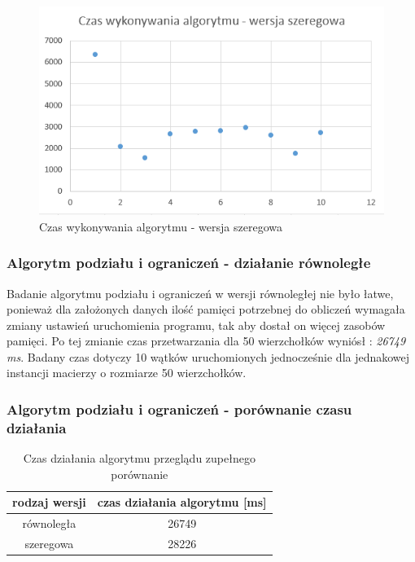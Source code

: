 \documentclass{article}
\begin{document}
		\begin{figure}[H]
			\centering
			\includegraphics[width=0.9\linewidth]{bbS2}
			\caption{Czas wykonywania algorytmu - wersja szeregowa}
		\end{figure}
	
	
		\subsubsection{Algorytm podziału i ograniczeń - działanie równoległe}
			Badanie algorytmu podziału i ograniczeń w wersji równoległej nie było łatwe, ponieważ dla założonych danych ilość pamięci potrzebnej do obliczeń wymagała zmiany ustawień uruchomienia programu, tak aby dostał on więcej zasobów pamięci. Po tej zmianie czas przetwarzania dla 50 wierzchołków wyniósł : \textit{26749 ms}. Badany czas dotyczy 10 wątków uruchomionych jednocześnie dla jednakowej instancji macierzy o rozmiarze 50 wierzchołków.
			
		\subsubsection{Algorytm podziału i ograniczeń - porównanie czasu działania}
			
				\begin{table}[H]
					\centering
					\caption{Czas działania algorytmu przeglądu zupełnego porównanie}
					\begin{tabular}{|c|c|}
						
						\hline rodzaj wersji& czas działania algorytmu [ms] \\ 
						\hline równoległa  & 26749 \\ 
						\hline szeregowa   & 28226 \\ 
						\hline 
					\end{tabular} 
				\end{table}
	
\end{document}
